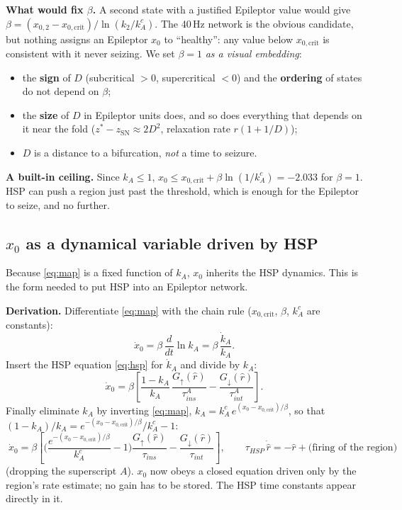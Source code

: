 \documentclass[11pt]{article}
\newcommand{\kA}{k_A}
\newcommand{\xc}{x_{0,\mathrm{crit}}}
\newcommand{\zsn}{z_{\mathrm{SN}}}
\begin{document}
\textbf{What would fix $\beta$.} A second state with a justified Epileptor value would give
$\beta = (x_{0,2}-\xc)/\ln(k_2/\kA^c)$. The 40\,Hz network is the obvious candidate, but nothing assigns an Epileptor $x_0$
to ``healthy'': any value below $\xc$ is consistent with it never seizing. We set $\beta=1$ \emph{as a visual embedding}:
\begin{itemize}
\item the \textbf{sign} of $D$ (subcritical $>0$, supercritical $<0$) and the \textbf{ordering} of states do not depend on
$\beta$;
\item the \textbf{size} of $D$ in Epileptor units does, and so does everything that depends on it near the fold ($z^*-\zsn
\approx 2D^2$, relaxation rate $r(1+1/D)$);
\item $D$ is a distance to a bifurcation, \emph{not} a time to seizure.
\end{itemize}
\textbf{A built-in ceiling.} Since $\kA\le1$, $x_0\le\xc + \beta\ln(1/\kA^c) = -2.033$ for $\beta=1$. HSP can push a region
just past the threshold, which is enough for the Epileptor to seize, and no further.

\subsection{$x_0$ as a dynamical variable driven by HSP}\label{sec:ode}
Because \eqref{eq:map} is a fixed function of $\kA$, $x_0$ inherits the HSP dynamics. This is the form needed to put HSP
into an Epileptor network.

\textbf{Derivation.} Differentiate \eqref{eq:map} with the chain rule ($\xc$, $\beta$, $\kA^c$ are constants):
\[
\dot x_0 = \beta\,\frac{d}{dt}\ln\kA = \beta\,\frac{\dot\kA}{\kA} .
\]
Insert the HSP equation \eqref{eq:hsp} for $\dot\kA$ and divide by $\kA$:
\[
\dot x_0 = \beta\left[\frac{1-\kA}{\kA}\,\frac{G_\uparrow(\hat r)}{\tau^A_{ins}} - \frac{G_\downarrow(\hat r)}{\tau^A_{int}}\right].
\]
Finally eliminate $\kA$ by inverting \eqref{eq:map}, $\kA = \kA^c\,e^{(x_0-\xc)/\beta}$, so that
$(1-\kA)/\kA = e^{-(x_0-\xc)/\beta}/\kA^c - 1$:
\begin{equation}\boxed{\;\dot x_0 = \beta\left[\Big(\frac{e^{-(x_0-\xc)/\beta}}{\kA^c} - 1\Big)\frac{G_\uparrow(\hat r)}{\tau_{ins}}
- \frac{G_\downarrow(\hat r)}{\tau_{int}}\right],\qquad \tau_{HSP}\,\dot{\hat r} = -\hat r + \text{(firing of the region)}\;}
\label{eq:ode}\end{equation}
(dropping the superscript $A$). $x_0$ now obeys a closed equation driven only by the region's rate estimate; no gain has
to be stored. The HSP time constants appear directly in it.
\end{document}
